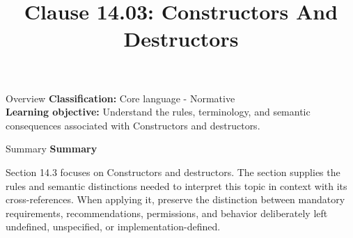 \documentclass[10pt,letterpaper]{article}
\title{Clause 14.03: Constructors And Destructors}
\author{}
\date{}
\begin{document}
\maketitle
\begin{CornellOverviewBox}{Overview}
\textbf{Classification:} Core language - Normative\\[2pt]
\textbf{Learning objective:} Understand the rules, terminology, and semantic consequences associated with Constructors and destructors.
\end{CornellOverviewBox}\begin{CornellSummaryBox}{Summary}
{\sffamily\bfseries\color{Accent} Summary}\par\vspace{3pt}Section 14.3 focuses on Constructors and destructors. The section supplies the rules and semantic distinctions needed to interpret this topic in context with its cross-references. When applying it, preserve the distinction between mandatory requirements, recommendations, permissions, and behavior deliberately left undefined, unspecified, or implementation-defined.
\end{CornellSummaryBox}
\end{document}
